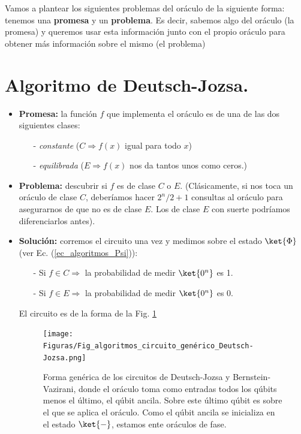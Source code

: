 \documentclass[a4paper,11pt]{book} %
\numberwithin{equation}{chapter}
\begin{document}
Vamos a plantear los siguientes problemas del oráculo de la siguiente forma: tenemos una \textbf{promesa} y un \textbf{problema}. Es decir, sabemos algo del oráculo (la promesa) y queremos usar esta información junto con el propio oráculo para obtener más información sobre el mismo (el problema)


	\section{Algoritmo de Deutsch-Jozsa.}

\begin{itemize}
	\item \textbf{Promesa:} la función $f$ que implementa el oráculo es de una de las dos siguientes clases: 
	\begin{itemize}
		\item[-] \textit{constante} ($C \Rightarrow f(x)$ igual para todo $x$)
		\item[-] \textit{equilibrada} ($E \Rightarrow f(x)$ nos da tantos unos como ceros.)
	\end{itemize}		
	
	\item \textbf{Problema:} descubrir si $f$ es de clase $C$ o $E$. (Clásicamente, si nos toca un oráculo de clase $C$, deberíamos hacer $2^n/2+1$ consultas al oráculo para asegurarnos de que no es de clase $E$. Los de clase $E$ con suerte podríamos diferenciarlos antes).
	
	\item \textbf{Solución:} corremos el circuito una vez y medimos sobre el estado $\ket{\Phi}$ (ver Ec. (\ref{ec_algoritmos_Psi})):
	\begin{itemize}
		\item[-] Si $f \in C \Rightarrow$ la probabilidad de medir $\ket{0^n}$ es 1.
		\item[-] Si $f \in E \Rightarrow$ la probabilidad de medir $\ket{0^n}$ es 0.
	\end{itemize}
	El circuito es de la forma de la Fig. \ref{Fig_algoritmos_circuito_genérico_Deutsch-Jozsa}
		\begin{figure}[h!]
		\centering 
		\texttt{[image: Figuras/Fig\_algoritmos\_circuito\_genérico\_Deutsch-Jozsa.png]}
		\caption{Forma genérica de los circuitos de Deutsch-Jozsa y Bernstein-Vazirani, donde el oráculo toma como entradas todos los qúbits 
		menos el último, el qúbit ancila. Sobre este último qúbit es sobre el que se aplica el oráculo. Como el qúbit ancila se inicializa en el 
		estado $\ket{-}$, estamos ente oráculos de fase.}
		\label{Fig_algoritmos_circuito_genérico_Deutsch-Jozsa}
		\end{figure}

\end{itemize}
\end{document}
